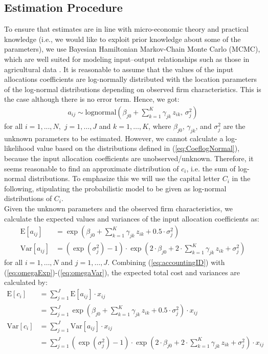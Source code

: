\documentclass[12pt]{article}
\begin{document}
\subsection{Estimation Procedure}
To ensure that estimates are in line with micro-economic theory and practical knowledge (i.e., we would like to exploit prior knowledge about some of the parameters), we use Bayesian Hamiltonian Markov-Chain Monte Carlo (MCMC), which are well suited for modeling input–output relationships such as those in agricultural data \citep{zitthen2022}.
It is reasonable to assume that the values of the input allocations coefficients are log-normally distributed with the location parameters of the log-normal distributions depending on observed firm characteristics. 
This is the case although there is no error term. 
Hence, we got:
\begin{align}
    a_{ij}\sim \text{lognormal}(\beta_{j0}+\sum_{k=1}^K \gamma_{jk} \, z_{ik}, \, \sigma_{j}^2)
\end{align}
for all $i=1,...,N,$ $j=1 , \ldots, J$ and $k=1 , \ldots, K$, where $\beta_{j0}$, $\gamma_{jk}$, and $\sigma_{j}^2$ are the unknown parameters to be estimated.
However, we cannot calculate a log-likelihood value based on the distributions defined in (\ref{eq:CoeflogNormal}), because the input allocation coefficients are unobserved/unknown.
Therefore, it seems reasonable to find an approximate distribution of $c_i$, i.e. the sum of log-normal distributions.
To emphasize this we will use the capital letter $C_i$ in the following, stipulating the probabilistic model to be given as log-normal distributions of $C_i$.
\\
Given the unknown parameters and the observed firm characteristics, we calculate the expected values and  variances of the input allocation coefficients as:
\begin{align}
    \text{E}[a_{ij}]
    & =\exp (\beta_{j0}+\sum_{k=1}^K \gamma_{jk} \, z_{ik} +        
    0.5\cdot \sigma_{j}^2) 
    \label{eq:omegaExp} \\
    \text{Var}[a_{ij}]
    & =(\exp(\sigma_{j}^2)-1) \cdot \exp(2\cdot\beta_{j0} +
    2\cdot\sum_{k=1}^K\gamma_{jk} \, z_{ik}+\sigma_{j}^2)
\end{align}
for all $i=1,\ldots,N$ and $j=1,\ldots,J$. 
Combining (\ref{eq:accountingID}) with (\ref{eq:omegaExp})-(\ref{eq:omegaVar}), the expected total cost and variances are calculated by:
\begin{align}
    \text{E}[c_i]
    & = \sum_{j=1}^J \text{E}[a_{ij}] \cdot x_{ij} \\
    & = \sum_{j=1}^J \exp (\beta_{j0} +\sum_{k=1}^K \gamma_{jk} \, z_{ik} + 0.5\cdot \sigma_{j}^2) \cdot x_{ij}
    \label{eq:yExp} \\
    \text{Var}[c_i]
    & = \sum_{j=1}^J \text{Var}[a_{ij}] \cdot x_{ij} \\
    & = \sum_{j=1}^J (\exp(\sigma_{j}^2)-1) \cdot \exp(2\cdot\beta_{j0} + 2\cdot\sum_{k=1}^K\gamma_{jk} \, z_{ik}+\sigma_{j}^2) \cdot x_{ij}
\end{align}
\end{document}
